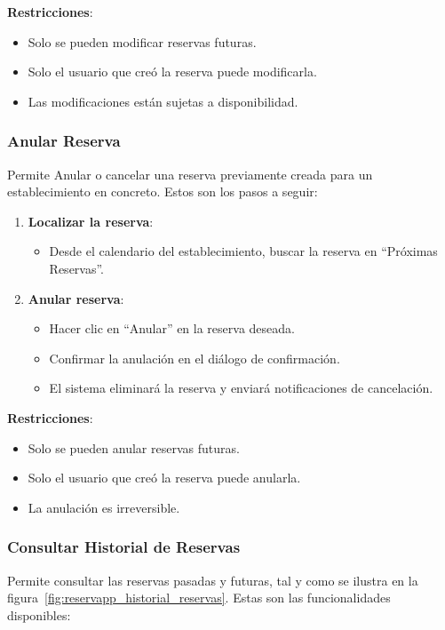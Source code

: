\textbf{Restricciones}:
\begin{itemize}
   \item Solo se pueden modificar reservas futuras.
   \item Solo el usuario que creó la reserva puede modificarla.
   \item Las modificaciones están sujetas a disponibilidad.
\end{itemize}

\subsubsection{Anular Reserva}
Permite Anular o cancelar una reserva previamente creada para un establecimiento en concreto. Estos son los pasos a seguir:

\begin{enumerate}
   \item \textbf{Localizar la reserva}:
   \begin{itemize}
      \item Desde el calendario del establecimiento, buscar la reserva en ``Próximas Reservas''.
   \end{itemize}
   \item \textbf{Anular reserva}:
   \begin{itemize}
      \item Hacer clic en ``Anular'' en la reserva deseada.
      \item Confirmar la anulación en el diálogo de confirmación.
      \item El sistema eliminará la reserva y enviará notificaciones de cancelación.
   \end{itemize}
\end{enumerate}

\textbf{Restricciones}:
\begin{itemize}
   \item Solo se pueden anular  reservas futuras.
   \item Solo el usuario que creó la reserva puede anularla.
   \item La anulación es irreversible.
\end{itemize}

\subsubsection{Consultar Historial de Reservas}
Permite consultar las reservas pasadas y futuras, tal y como se ilustra en la figura~\ref{fig:reservapp_historial_reservas}. Estas son las funcionalidades disponibles:

